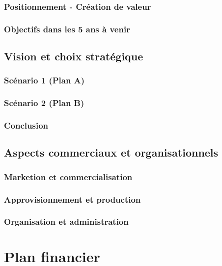 \documentclass[a4paper]{report}
\begin{document}
\subsection{Positionnement - Création de valeur}

\subsection{Objectifs dans les 5 ans à venir}

\section{Vision et choix stratégique}

\subsection{Scénario 1 (Plan A)}

\subsection{Scénario 2 (Plan B)}

\subsection{Conclusion}

\section{Aspects commerciaux et organisationnels}

\subsection{Marketion et commercialisation}

\subsection{Approvisionnement et production}

\subsection{Organisation et administration}




\chapter{Plan financier}
\end{document}
